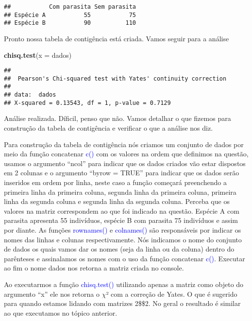 \documentclass[titlepage, oneside, openany, a4paper]{book}
\newenvironment{Shaded}{\begin{snugshade}}{\end{snugshade}}
\newcommand{\DataTypeTok}[1]{\textcolor[rgb]{0.13,0.29,0.53}{#1}}
\newcommand{\KeywordTok}[1]{\textcolor[rgb]{0.13,0.29,0.53}{\textbf{#1}}}
\newcommand{\NormalTok}[1]{#1}
\begin{document}
\begin{verbatim}
##           Com parasita Sem parasita
## Espécie A           55           75
## Espécie B           90          110
\end{verbatim}

Pronto nossa tabela de contigência está criada. Vamos seguir para a análise

\begin{Shaded}
\begin{Highlighting}[]
\KeywordTok{chisq.test}\NormalTok{(}\DataTypeTok{x =}\NormalTok{ dados)}
\end{Highlighting}
\end{Shaded}

\begin{verbatim}
## 
##  Pearson's Chi-squared test with Yates' continuity correction
## 
## data:  dados
## X-squared = 0.13543, df = 1, p-value = 0.7129
\end{verbatim}

Análise realizada. Díficil, penso que não. Vamos detalhar o que fizemos para construção da tabela de contigência e verificar o que a análise nos diz.

Para construção da tabela de contigência nós criamos um conjunto de dados por meio da função concatenar \textcolor{blue}{c()} com os valores na ordem que definimos na questão, usamos o argumento ``ncol'' para indicar que os dados criados vão estar dispostos em 2 colunas e o argumento ``byrow = TRUE'' para indicar que os dados serão inseridos em ordem por linha, neste caso a função começará preenchendo a primeira linha da primeira coluna, segunda linha da primeira coluna, primeira linha da segunda coluna e segunda linha da segunda coluna. Perceba que os valores na matriz correspondem ao que foi indicado na questão. Espécie A com parasita apresenta 55 indivíduos, espécie B com parasita 75 indivíduos e assim por diante. As funções \textcolor{blue}{rownames()} e \textcolor{blue}{colnames()} são responsáveis por indicar os nomes das linhas e colunas respectivamente. Nós indicamos o nome do conjunto de dados os quais vamos dar os nomes (seja da linha ou da coluna) dentro do parênteses e assinalamos os nomes com o uso da função concatenar \textcolor{blue}{c()}. Executar ao fim o nome dados nos retorna a matriz criada no console.

Ao executarmos a função \textcolor{blue}{chisq.test()} utilizando apenas a matriz como objeto do argumento ``x'' ele nos retorna o \(\chi\)² com a correção de Yates. O que é sugerido para quando estamos lidando com matrizes 2\$\times\$2. No geral o resultado é similar ao que executamos no tópico anterior.
\end{document}
